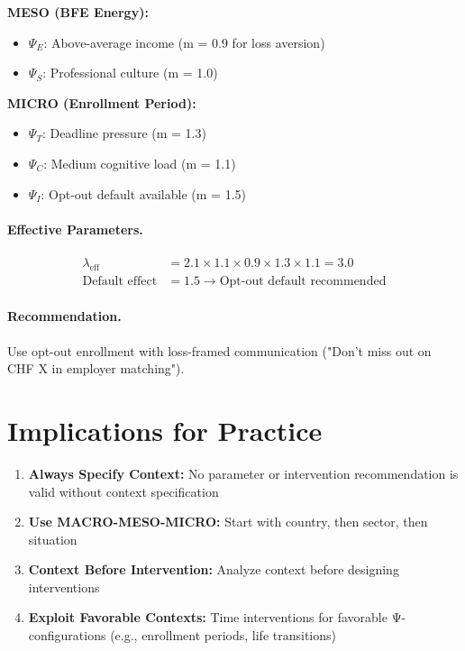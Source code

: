 \textbf{MESO (BFE Energy):}
\begin{itemize}[nosep]
\item $\Psi_E$: Above-average income (m = 0.9 for loss aversion)
\item $\Psi_S$: Professional culture (m = 1.0)
\end{itemize}

\textbf{MICRO (Enrollment Period):}
\begin{itemize}[nosep]
\item $\Psi_T$: Deadline pressure (m = 1.3)
\item $\Psi_C$: Medium cognitive load (m = 1.1)
\item $\Psi_I$: Opt-out default available (m = 1.5)
\end{itemize}

\paragraph{Effective Parameters.}
\begin{align}
\lambda_{\text{eff}} &= 2.1 \times 1.1 \times 0.9 \times 1.3 \times 1.1 = 3.0 \\
\text{Default effect} &= 1.5 \rightarrow \text{Opt-out default recommended}
\end{align}

\paragraph{Recommendation.}
Use opt-out enrollment with loss-framed communication
("Don't miss out on CHF X in employer matching").


\section{Implications for Practice}
\label{sec:when-practice}

\begin{tcolorbox}[colback=green!5!white, colframe=green!75!black,
    title=Practical Implications]
\begin{enumerate}
\item \textbf{Always Specify Context:} No parameter or intervention recommendation
      is valid without context specification
\item \textbf{Use MACRO-MESO-MICRO:} Start with country, then sector, then situation
\item \textbf{Context Before Intervention:} Analyze context before designing interventions
\item \textbf{Exploit Favorable Contexts:} Time interventions for favorable
      Ψ-configurations (e.g., enrollment periods, life transitions)
\end{enumerate}
\end{tcolorbox}


